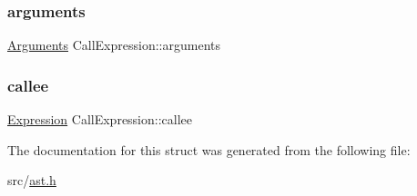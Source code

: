 \subsubsection{\texorpdfstring{arguments}{arguments}}
{\footnotesize\ttfamily \hyperlink{struct_arguments}{Arguments} Call\+Expression\+::arguments}

\mbox{\label{struct_call_expression_ae87e9c0eff85a02aaaf7281cb8782936}} 
\subsubsection{\texorpdfstring{callee}{callee}}
{\footnotesize\ttfamily \hyperlink{ast_8h_a4cb273a4d960cd13ea17d08f254493e8}{Expression} Call\+Expression\+::callee}



The documentation for this struct was generated from the following file\+:\begin{DoxyCompactItemize}
\item 
src/\hyperlink{ast_8h}{ast.\+h}\end{DoxyCompactItemize}
